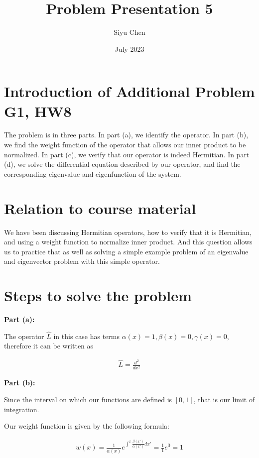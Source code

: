 \documentclass{article}
\title{Problem Presentation 5}
\author{Siyu Chen}
\date{July 2023}
\numberwithin{equation}{section}
\begin{document}
\maketitle

\section{Introduction of Additional Problem G1, HW8}

The problem is in three parts. In part (a), we identify the operator. In part (b), we find the weight function of the operator that allows our inner product to be normalized. In part (c), we verify that our operator is indeed Hermitian. In part (d), we solve the differential equation described by our operator, and find the corresponding eigenvalue and eigenfunction of the system.

\section{Relation to course material}

We have been discussing Hermitian operators, how to verify that it is Hermitian, and using a weight function to normalize inner product. And this question allows us to practice that as well as solving a simple example problem of an eigenvalue and eigenvector problem with this simple operator.

\section{Steps to solve the problem }

\textbf{Part (a):}

The operator $\hat{L}$ in this case has terms $\alpha(x) = 1, \beta(x) = 0, \gamma(x) = 0$, therefore it can be written as 

\begin{align}
    \hat{L} = \frac{d^2}{dx^2}
\end{align}

\textbf{Part (b):}

Since the interval on which our functions are defined is $[0,1]$, that is our limit of integration.

Our weight function is given by the following formula:

\begin{align}
    w(x) = \frac{1}{\alpha(x)} e^{\int^{x} \frac{\beta(x')}{\alpha(x')}dx'} = \frac{1}{1} e^0 = 1
\end{align}
\end{document}
